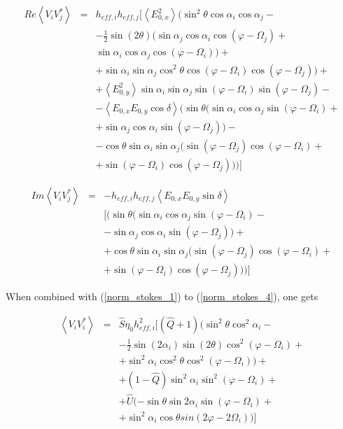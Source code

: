 \documentclass[a4paper,14pt]{extbook}
\begin{document}
\begin{eqnarray}
Re \left\langle V_i V_j^{*}\right\rangle &=&  h_{eff,i} h_{eff,j}[\left\langle E_{0,x}^2\right\rangle (\sin^2 \theta \cos \alpha_i \cos \alpha_j - \\
& & - \frac{1}{2}  \sin(2\theta) (\sin \alpha_j \cos \alpha_i \cos(\varphi - \Omega_j)+\nonumber \\
& & \sin \alpha_i \cos \alpha_j \cos(\varphi - \Omega_i) ) + \nonumber \\
& & + \sin \alpha_i \sin \alpha_j \cos^2\theta \cos(\varphi - \Omega_i) \cos(\varphi - \Omega_j))+ \nonumber \\
& & + \left\langle E_{0,y}^2 \right\rangle \sin \alpha_i \sin \alpha_j \sin (\varphi - \Omega_i) \sin (\varphi - \Omega_j)-\nonumber \\
& & -\left\langle E_{0,x} E_{0,y} \cos\delta \right\rangle(\sin \theta(\sin \alpha_i \cos \alpha_j \sin (\varphi - \Omega_i) +  \nonumber \\
& & + \sin \alpha_j \cos \alpha_i \sin (\varphi - \Omega_j))-\nonumber \\
& & -\cos \theta \sin \alpha_i \sin \alpha_j(\sin (\varphi - \Omega_j) \cos (\varphi - \Omega_i)+ \nonumber \\
& & + \sin (\varphi - \Omega_i) \cos (\varphi - \Omega_j) ) )]\nonumber
\end{eqnarray}

\begin{eqnarray}
Im \left\langle V_i V_j^{*}\right\rangle &=& - h_{eff,i} h_{eff,j}\left\langle E_{0,x} E_{0,y} \sin \delta \right\rangle \\
& & [ (\sin \theta(\sin \alpha_i \cos \alpha_j \sin (\varphi - \Omega_i) -  \nonumber \\
& & - \sin \alpha_j \cos \alpha_i \sin (\varphi - \Omega_j))+ \nonumber \\
& & + \cos \theta \sin \alpha_i \sin \alpha_j(\sin (\varphi - \Omega_j) \cos (\varphi - \Omega_i)+ \nonumber \\
& & + \sin (\varphi - \Omega_i) \cos (\varphi - \Omega_j) ) )]\nonumber
\end{eqnarray}

When combined with (\ref{norm_stokes_1}) to (\ref{norm_stokes_4}), one gets

\begin{eqnarray}
\left\langle V_i V_i^{*} \right\rangle &=& \hat{S}\eta_0 h_{eff,i}^2[(\hat{Q}+1) (\sin^2 \theta \cos^2 \alpha_i -\\
& & -\frac{1}{2} \sin (2\alpha_i) \sin(2\theta) \cos^2(\varphi - \Omega_i) + \nonumber \\
& & + \sin^2\alpha_i \cos^2\theta \cos^2(\varphi - \Omega_i))+ \nonumber \\
& & + (1-\hat{Q}) \sin^2\alpha_i \sin^2 (\varphi - \Omega_i)+ \nonumber \\
& & +  \hat{U}  (-\sin \theta \sin 2\alpha_i \sin(\varphi - \Omega_i) +\nonumber \\
& & + \sin^2\alpha_i \cos \theta sin(2\varphi - 2\Omega_i)) ]\nonumber
\end{eqnarray}
\end{document}
